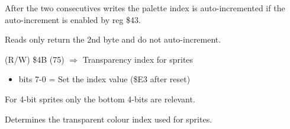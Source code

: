 After the two consecutives writes the palette index is
auto-incremented if the auto-increment is enabled by reg \$43.

Reads only return the 2nd byte and do not auto-increment.

(R/W) \$4B (75) $\Rightarrow$ Transparency index for sprites
\begin{itemize}
\item[] bits 7-0 = Set the index value (\$E3 after reset)
\end{itemize}
For 4-bit sprites only the bottom 4-bits are relevant.

Determines the transparent colour index used for sprites.

